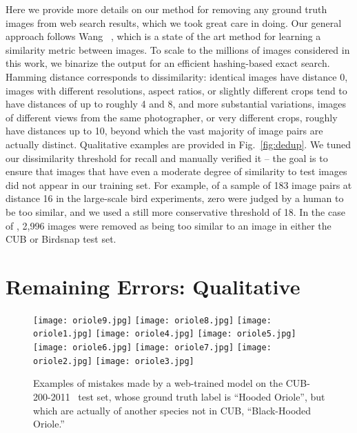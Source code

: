 \documentclass[runningheads]{llncs}
\begin{document}
Here we provide more details on our method for removing any ground truth images from web search results, which we took great care in doing.
Our general approach follows Wang \etal~\cite{wang2014learning}, which is a state of the art method for learning a similarity metric between images.
To scale \cite{wang2014learning} to the millions of images considered in this work, we binarize the output for an efficient hashing-based exact search.
Hamming distance corresponds to dissimilarity:
identical images have distance 0, images with different resolutions, aspect ratios, or slightly different crops tend to have distances of up to roughly 4 and 8, and more substantial variations, \eg images of different views from the same photographer, or very different crops, roughly have distances up to 10, beyond which the vast majority of image pairs are actually distinct.
Qualitative examples are provided in Fig.~\ref{fig:dedup}.
We tuned our dissimilarity threshold for recall and manually verified it -- the goal is to ensure that images that have even a moderate degree of similarity to test images did not appear in our training set.
For example, of a sample of 183 image pairs at distance 16 in the large-scale bird experiments, zero were judged by a human to be too similar, and we used a still more conservative threshold of 18.
In the case of \lbird{}, 2,996 images were removed as being too similar to an image in either the CUB or Birdsnap test set.


\section{Remaining Errors: Qualitative}

\begin{figure}[t]
\centering
\texttt{[image: oriole9.jpg]}
\texttt{[image: oriole8.jpg]}
\texttt{[image: oriole1.jpg]}
\texttt{[image: oriole4.jpg]}
\texttt{[image: oriole5.jpg]}
\texttt{[image: oriole6.jpg]}
\texttt{[image: oriole7.jpg]}
\texttt{[image: oriole2.jpg]}
\texttt{[image: oriole3.jpg]}
\caption{Examples of mistakes made by a web-trained model on the CUB-200-2011~\cite{wah2011multiclass} test set, whose ground truth label is ``Hooded Oriole'', but which are actually of another species not in CUB, ``Black-Hooded Oriole.''}
\label{fig:oriole}
\end{figure}
\end{document}

